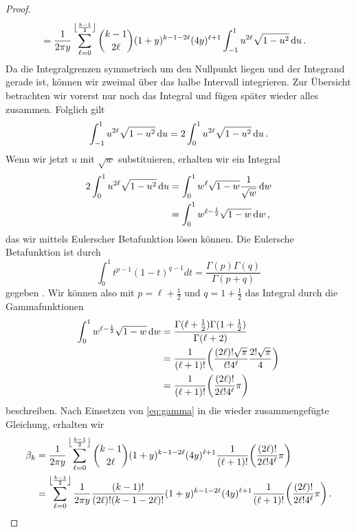 \documentclass[../Bachelor_LennartKoliwer.tex]{subfiles}
\begin{document}
\begin{proof}
\begin{align*}
        &= \frac{1}{2\pi y}\sum_{\ell=0}^{\left\lfloor\frac{k-1}{2}\right\rfloor}\binom{k-1}{2\ell}(1+y)^{k-1-2\ell} (4y)^{\ell+1} \int_{-1}^{1}u^{2\ell}\sqrt{1-u^2}\,\text{d} u\,.
    \end{align*}
    Da die Integralgrenzen symmetrisch um den Nullpunkt liegen und der Integrand gerade ist, können wir zweimal über das halbe Intervall integrieren.
    Zur Übersicht betrachten wir vorerst nur noch das Integral und fügen später wieder alles zusammen.
    Folglich gilt
    \begin{align*}
        \int_{-1}^{1}u^{2\ell}\sqrt{1-u^2}\,\text{d} u =  2\int_{0}^{1}u^{2\ell}\sqrt{1-u^2}\,\text{d} u\,.        
    \end{align*}
    Wenn wir jetzt $u$ mit $\sqrt{w}$ substituieren, erhalten wir ein Integral
    \begin{align*}
         2\int_{0}^{1}u^{2\ell}\sqrt{1-u^2}\,\text{d} u &=  \int_{0}^{1}w^{\ell}\sqrt{1-w}\frac{1}{\sqrt{w}}\,\text{d} w \\
        &=  \int_{0}^{1}w^{\ell-\frac12}\sqrt{1-w}\,\text{d} w\,,
    \end{align*}
    das wir mittels Eulerscher Betafunktion lösen können.
    Die Eulersche Betafunktion ist durch 
    \[
        \int_{0}^{1}t^{p-1}(1-t)^{q-1}dt = \frac{\Gamma(p)\Gamma(q)}{\Gamma(p+q)} 
    \]
    gegeben \cite[19]{Beta}. Wir können also mit $p=\ell+\frac12$ und $q=1+\frac12$ das Integral durch die Gammafunktionen 
    \begin{align}
        \int_{0}^{1}w^{\ell-\frac12}\sqrt{1-w}\diff w &= \frac{\Gamma(\ell+\frac12)\Gamma(1+\frac12)}{\Gamma(\ell+2)} \nonumber \\
        &= \frac{1}{(\ell+1)!}\lr{\frac{(2\ell)!\sqrt{\pi}}{\ell!4^\ell}\frac{2!\sqrt{\pi}}{4}} \nonumber \\
        &= \frac{1}{(\ell+1)!}\lr{\frac{(2\ell)!}{2\ell!4^\ell}\pi} \label{eq:gamma}
    \end{align}
    beschreiben.
    Nach Einsetzen von \eqref{eq:gamma} in die wieder zusammengefügte Gleichung, erhalten wir 
    \begin{align*}
        \beta_k &= \frac{1}{2\pi y}\sum_{\ell=0}^{\left\lfloor\frac{k-1}{2}\right\rfloor}\binom{k-1}{2\ell}(1+y)^{k-1-2\ell} (4y)^{\ell+1} \frac{1}{(\ell+1)!}\lr{\frac{(2\ell)!}{2\ell!4^\ell}\pi} \\
        &= \sum_{\ell=0}^{\left\lfloor\frac{k-1}{2}\right\rfloor} \frac{1}{2\pi y} \frac{(k-1)!}{(2\ell)!(k-1-2\ell)!}(1+y)^{k-1-2\ell} (4y)^{\ell+1} \frac{1}{(\ell+1)!}\lr{\frac{(2\ell)!}{2\ell!4^\ell}\pi}\,.
    \end{align*}


\end{proof}
\end{document}
